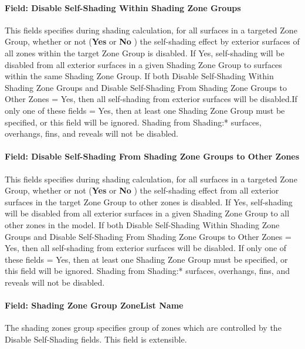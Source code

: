 \paragraph{Field: Disable Self-Shading Within Shading Zone Groups}\label{fieldself--disable-shading-within-a-zone-group}
This fields specifies during shading calculation, for all surfaces in a targeted Zone Group, whether or not (\textbf{Yes} or \textbf{No} ) the self-shading effect by exterior surfaces of all zones within the target Zone Group is disabled. If Yes, self-shading will be disabled from all exterior surfaces in a given Shading Zone Group to surfaces within the same Shading Zone Group. If both Disable Self-Shading Within Shading Zone Groups and Disable Self-Shading From Shading Zone Groups to Other Zones = Yes, then all self-shading from exterior surfaces will be disabled.If only one of these fields = Yes, then at least one Shading Zone Group must be specified, or this field will be ignored. Shading from Shading:* surfaces, overhangs, fins, and reveals will not be disabled.

\paragraph{Field: Disable Self-Shading From Shading Zone Groups to Other Zones}\label{field-self-disable-shading-between-zone-groups}
This fields specifies during shading calculation, for all surfaces in a targeted Zone Group, whether or not (\textbf{Yes} or \textbf{No} ) the self-shading effect from all exterior surfaces in the target Zone Group to other zones is disabled. If Yes, self-shading will be disabled from all exterior surfaces in a given Shading Zone Group to all other zones in the model. If both Disable Self-Shading Within Shading Zone Groups and Disable Self-Shading From Shading Zone Groups to Other Zones = Yes, then all self-shading from exterior surfaces will be disabled. If only one of these fields = Yes, then at least one Shading Zone Group must be specified, or this field will be ignored. Shading from Shading:* surfaces, overhangs, fins, and reveals will not be disabled.

\paragraph{Field: Shading Zone Group ZoneList Name}\label{field-shading-zone-group-zoneList-name}
The shading zones group specifies group of zones which are controlled by the Disable Self-Shading fields.
This field is extensible.

